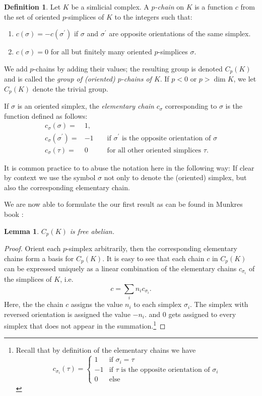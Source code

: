 \documentclass[toc=bib, headinclude]{scrartcl}
\theoremstyle{plain}
\newtheorem{lemma}[theorem]{Lemma}
\theoremstyle{definition}
\newtheorem	{definition}[theorem]{Definition}
\theoremstyle{remark}
\begin{document}
\begin{definition}\label{def-chain}
	Let $K$ be a simlicial complex. A \textit{$p$-chain} on $K$ is a function $c$ from the set of oriented $p$-simplices of $K$ to the integers such that:
	\begin{enumerate}
		\item $c(\sigma)=-c(\sigma^\prime)$ if $\sigma$ and $\sigma^\prime$ are opposite orientations of the same simplex.
		\item $c(\sigma)=0$ for all but finitely many oriented $p$-simplices $\sigma$.
	\end{enumerate}
We add $p$-chains by adding their values; the resulting group is denoted $C_p(K)$ and is called the \textit{group of (oriented) $p$-chains of $K$}. If $p<0$ or $p>\dim K$, we let $C_p(K)$ denote the trivial group.

If $\sigma$ is an oriented simplex, the \textit{elementary chain} $c_\sigma$ corresponding to $\sigma$ is the function defined as follows:
\begin{align*}c_\sigma(\sigma)=&1,\\
 c_\sigma(\sigma^\prime)=&-1&&\text{ if $\sigma^\prime$ is the opposite orientation of $\sigma$}\\
 c_\sigma(\tau)=&0 &&\text{ for all other oriented simplices $\tau$.} 
 \end{align*}
\end{definition}

It is common practice to to abuse the notation here in the following way: If clear by context we use the symbol $\sigma$ not only to denote the (oriented) simplex, but also the corresponding elementary chain.

We are now able to formulate the our first result as can be found in Munkres book \cite[Lemma 5.1, p. 28]{mu}:
\begin{lemma}
	$C_p(K)$ is free abelian. 
\end{lemma}

\begin{proof}
	Orient each $p$-simplex arbitrarily, then the corresponding elementary chains form a basis for $C_p(K)$.
	It is easy to see that each chain $c$ in $C_p(K)$ can be expressed uniquely as a linear combination of the elementary chains $c_{\sigma_i}$ of the simplices of $K$, i.e.
	\[
	c=\sum_{i}n_i c_{\sigma_i}.
	\]
	Here, the the chain $c$ assigns the value $n_i$ to each simplex $\sigma_i$. The simplex with reversed orientation is assigned the value $-n_i$. and $0$ gets assigned to every simplex that does not appear in the summation.\footnote{Recall that by definition of the elementary chains we have \[c_{\sigma_i}(\tau)=\begin{cases}
		1 &\text{if }\sigma_i=\tau\\
		-1&\text{if }\tau \text{ is the opposite orientation of }\sigma_i\\
		0&\text{else}
		\end{cases}
		\]}
\end{proof}
\end{document}
